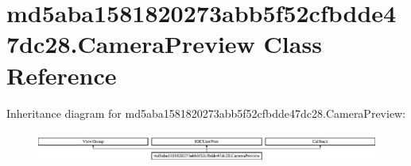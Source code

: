 \hypertarget{classmd5aba1581820273abb5f52cfbdde47dc28_1_1CameraPreview}{}\section{md5aba1581820273abb5f52cfbdde47dc28.\+Camera\+Preview Class Reference}
\label{classmd5aba1581820273abb5f52cfbdde47dc28_1_1CameraPreview}
Inheritance diagram for md5aba1581820273abb5f52cfbdde47dc28.\+Camera\+Preview\+:\begin{figure}[H]
\begin{center}
\leavevmode
\includegraphics[height=1.051643cm]{classmd5aba1581820273abb5f52cfbdde47dc28_1_1CameraPreview}
\end{center}
\end{figure}
